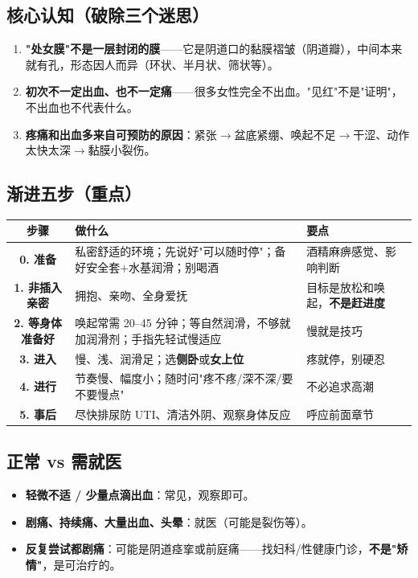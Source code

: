 \subsection{核心认知（破除三个迷思）}

\begin{enumerate}[leftmargin=2em,itemsep=0.3em]
  \item \textbf{"处女膜"不是一层封闭的膜}——它是阴道口的黏膜褶皱（阴道瓣），中间本来就有孔，形态因人而异（环状、半月状、筛状等）。
  \item \textbf{初次不一定出血、也不一定痛}——很多女性完全不出血。"见红"不是"证明"，不出血也不代表什么。
  \item \textbf{疼痛和出血多来自可预防的原因}：紧张$\rightarrow$盆底紧绷、唤起不足$\rightarrow$干涩、动作太快太深$\rightarrow$黏膜小裂伤。
\end{enumerate}

\subsection{渐进五步（重点）}

\begin{tabularx}{\linewidth}{C X X}
\toprule
\textbf{步骤} & \textbf{做什么} & \textbf{要点} \\
\midrule
\textbf{0. 准备} & 私密舒适的环境；先说好"可以随时停"；备好安全套+水基润滑；别喝酒 & 酒精麻痹感觉、影响判断 \\
\textbf{1. 非插入亲密} & 拥抱、亲吻、全身爱抚 & 目标是放松和唤起，\textbf{不是赶进度} \\
\textbf{2. 等身体准备好} & 唤起常需 20--45 分钟；等自然润滑，不够就加润滑剂；手指先轻试慢适应 & 慢就是技巧 \\
\textbf{3. 进入} & 慢、浅、润滑足；选\textbf{侧卧}或\textbf{女上位} & 疼就停，别硬忍 \\
\textbf{4. 进行} & 节奏慢、幅度小；随时问"疼不疼/深不深/要不要慢点" & 不必追求高潮 \\
\textbf{5. 事后} & 尽快排尿防 UTI、清洁外阴、观察身体反应 & 呼应前面章节 \\
\bottomrule
\end{tabularx}

\subsection{正常 vs 需就医}

\begin{itemize}[leftmargin=2em,itemsep=0.3em]
  \item \textbf{轻微不适 / 少量点滴出血}：常见，观察即可。
  \item \textbf{剧痛、持续痛、大量出血、头晕}：就医（可能是裂伤等）。
  \item \textbf{反复尝试都剧痛}：可能是阴道痉挛或前庭痛——找妇科/性健康门诊，\textbf{不是"矫情"}，是可治疗的。
\end{itemize}

